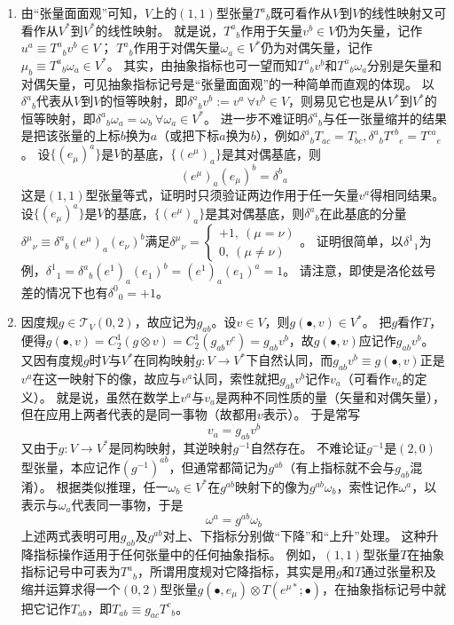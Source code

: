 \begin{enumerate}[1.]
\item 由``张量面面观''可知，$V$上的$(1, 1)$型张量$T^a{}_b$既可看作从$V$到$V$的线性映射又可看作从$V^*$到$V^*$的线性映射。
就是说，$T^a{}_b$作用于矢量$v^b \in V$仍为矢量，记作$u^a \equiv T^a{}_bv^b \in V$；
$T^a{}_b$作用于对偶矢量$\omega_a \in V^*$仍为对偶矢量，记作$\mu_b \equiv T^a{}_b\omega_a \in V^*$。
其实，由抽象指标也可一望而知$T^a{}_bv^b$和$T^a{}_b\omega_a$分别是矢量和对偶矢量，可见抽象指标记号是``张量面面观''的一种简单而直观的体现。
以$\delta^a{}_b$代表从$V$到$V$的恒等映射，即$\delta^a{}_bv^b := v^a ~ \forall v^b \in V$，则易见它也是从$V^*$到$V^*$的恒等映射，即$\delta^a{}_b\omega_a = \omega_b ~ \forall \omega_a \in V^*$。
进一步不难证明$\delta^a{}_b$与任一张量缩并的结果是把该张量的上标$b$换为$a$（或把下标$a$换为$b$），例如$\delta^a{}_bT_{ac} = T_{bc}, \delta^a{}_bT^{cb}{}_e = T^{ca}{}_e$。
设$\{(e_\mu)^a\}$是$V$的基底，$\{(e^\mu)_a\}$是其对偶基底，则
$$(e^\mu)_a(e_\mu)^b = \delta^b{}_a$$
这是$(1, 1)$型张量等式，证明时只须验证两边作用于任一矢量$v^a$得相同结果。
设$\{(e_\mu)^a\}$是$V$的基底，$\{(e^\mu)_a\}$是其对偶基底，则$\delta^a{}_b$在此基底的分量$\delta^\mu{}_\nu \equiv \delta^a{}_b(e^\mu)_a(e_\nu)^b$满足$\delta^\mu{}_\nu = \begin{cases}+1, ~ (\mu = \nu) \\0, ~ (\mu \neq \nu)\end{cases}$。
证明很简单，以$\delta^1{}_1$为例，$\delta^1{}_1 = \delta^a{}_b(e^1)_a(e_1)^b = (e^1)_a(e_1)^a = 1$。
请注意，即使是洛伦兹号差的情况下也有$\delta^0{}_0 = +1$。
\item 因度规$g \in \mathscr{T}_V(0, 2)$，故应记为$g_{ab}$。设$v \in V$，则$g(\bullet, v) \in V^*$。
把$g$看作$T$，便得$g(\bullet, v) = C^1_2(g \otimes v) = C^1_2(g_{ab}v^c) = g_{ab}v^b$，故$g(\bullet, v)$应记作$g_{ab}v^b$。
又因有度规$g$时$V$与$V^*$在同构映射$g \colon V \to V^*$下自然认同，而$g_{ab}v^b \equiv g(\bullet, v)$正是$v^a$在这一映射下的像，故应与$v^a$认同，索性就把$g_{ab}v^b$记作$v_a$（可看作$v_a$的定义）。
就是说，虽然在数学上$v^a$与$v_a$是两种不同性质的量（矢量和对偶矢量），但在应用上两者代表的是同一事物（故都用$v$表示）。
于是常写
$$v_a = g_{ab}v^b$$
又由于$g \colon V \to V^*$是同构映射，其逆映射$g^{-1}$自然存在。
不难论证$g^{-1}$是$(2, 0)$型张量，本应记作$(g^{-1})^{ab}$，但通常都简记为$g^{ab}$（有上指标就不会与$g_{ab}$混淆）。
根据类似推理，任一$\omega_b \in V^*$在$g^{ab}$映射下的像为$g^{ab}\omega_b$，索性记作$\omega^a$，以表示与$\omega_a$代表同一事物，于是
$$\omega^a = g^{ab}\omega_b$$
上述两式表明可用$g_{ab}$及$g^{ab}$对上、下指标分别做``下降''和``上升''处理。
这种升降指标操作适用于任何张量中的任何抽象指标。
例如，$(1, 1)$型张量$T$在抽象指标记号中可表为$T^a{}_b$，所谓用度规对它降指标，其实是用$g$和$T$通过张量积及缩并运算求得一个$(0, 2)$型张量$g(\bullet, e_\mu) \otimes T(e^{\mu*}; \bullet)$，在抽象指标记号中就把它记作$T_{ab}$，即$T_{ab} \equiv g_{ac}T^c{}_b$。
\end{enumerate}

